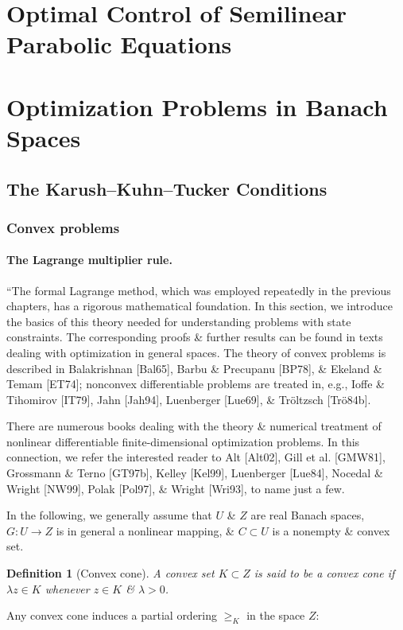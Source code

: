 \documentclass[oneside]{book}
\numberwithin{equation}{section}
\newtheorem{definition}{Definition}[chapter]
\begin{document}
\section{Optimal Control of Semilinear Parabolic Equations}

\section{Optimization Problems in Banach Spaces}

\subsection{The Karush--Kuhn--Tucker Conditions}

\subsubsection{Convex problems}

\paragraph{The Lagrange multiplier rule.} ``The formal Lagrange method, which was employed repeatedly in the previous chapters, has a rigorous mathematical foundation. In this section, we introduce the basics of this theory needed for understanding problems with state constraints. The corresponding proofs \& further results can be found in texts dealing with optimization in general spaces. The theory of convex problems is described in Balakrishnan [Bal65], Barbu \& Precupanu [BP78], \& Ekeland \& Temam [ET74]; nonconvex differentiable problems are treated in, e.g., Ioﬀe \& Tihomirov [IT79], Jahn [Jah94], Luenberger [Lue69], \& Tr\"oltzsch [Tr\"o84b].

There are numerous books dealing with the theory \& numerical treatment of nonlinear differentiable finite-dimensional optimization problems. In this connection, we refer the interested reader to Alt [Alt02], Gill et al. [GMW81], Grossmann \& Terno [GT97b], Kelley [Kel99], Luenberger [Lue84], Nocedal \& Wright [NW99], Polak [Pol97], \& Wright [Wri93], to name just a few.

In the following, we generally assume that $U$ \& $Z$ are real Banach spaces, $G:U\to Z$ is in general a nonlinear mapping, \& $C\subset U$ is a nonempty \& convex set.

\begin{definition}[Convex cone]
	A convex set $K\subset Z$ is said to be a \emph{convex cone} if $\lambda z\in K$ whenever $z\in K$ \& $\lambda > 0$.
\end{definition}
Any convex cone induces a partial ordering $\ge_K$ in the space $Z$:
\end{document}
